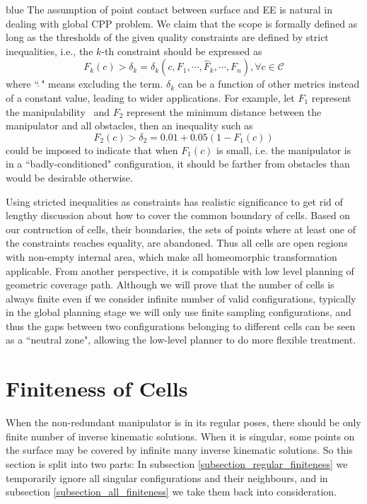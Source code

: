 \documentclass[Afour,sageh,times]{sagej}
\begin{document}
\begin{color}{blue}
The assumption of point contact between surface and EE is natural in dealing with global CPP problem. 
We claim that the scope is formally defined as long as the thresholds of the given quality constraints are defined by strict inequalities, i.e., the $k$-th constraint should be expressed as
\begin{equation}\label{equ_strict}
F_k(c) > \delta_k = \delta_k(c, F_1, \cdots, \hat{F}_k, \cdots, F_{n}), \forall c\in \mathscr{C}
\end{equation} 
where ``$\hat{\ }$" means excluding the term. $\delta_k$ can be a function of other metrics instead of a constant value, leading to wider applications. 
For example, let $F_1$ represent the manipulability~\cite{yoshikawa1990translational} 
and $F_2$ represent the minimum distance between the manipulator and all obstacles, then an inequality such as
\begin{equation}
F_2(c) > \delta_2 = 0.01+0.05(1-F_1(c))
\end{equation}
could be imposed to indicate that when $F_1(c)$ is small, i.e. the manipulator is in a ``badly-conditioned" configuration, it should be farther from obstacles than would be desirable otherwise. 


Using stricted inequalities as constraints has realistic significance to get rid of lengthy discussion about how to cover the common boundary of cells. Based on our contruction of cells, their boundaries, the sets of points where at least one of the constraints reaches equality, are abandoned. Thus all cells are open regions with non-empty internal area, which make all homeomorphic transformation applicable. 
From another perspective, it is compatible with low level planning of geometric coverage path. Although we will prove that the number of cells is always finite even if we consider infinite number of valid configurations, typically in the global planning stage we will only use finite sampling configurations, and thus the gaps between two configurations belonging to different cells can be seen as a ``neutral zone", allowing the low-level planner to do more flexible treatment. 
\end{color}




\section{Finiteness of Cells}\label{section_finiteness_of_cells}
When the non-redundant manipulator is in its regular poses, there should be only finite number of inverse kinematic solutions. When it is singular, some points on the surface may be covered by infinite many inverse kinematic solutions. So this section is split into two parts: In subsection \ref{subsection_regular_finiteness} we temporarily ignore all singular configurations and their neighbours, and in subsection \ref{subsection_all_finiteness} we take them back into consideration. 
\end{document}
